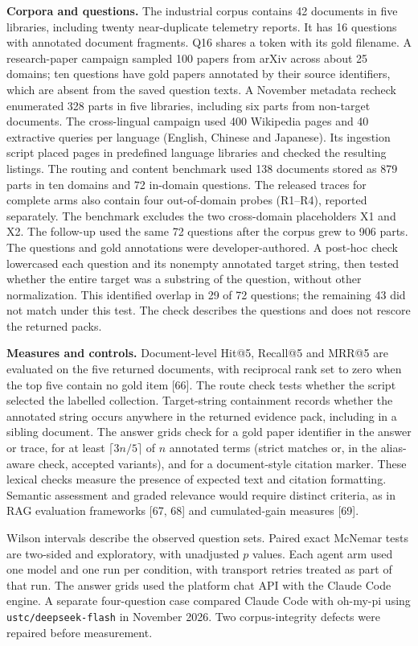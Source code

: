 \textbf{Corpora and questions.} The industrial corpus contains 42 documents
in five libraries, including twenty near-duplicate telemetry reports. It
has 16 questions with annotated document fragments. Q16 shares a token with
its gold filename. A research-paper campaign sampled 100 papers from arXiv
across about 25 domains; ten questions have gold papers annotated by their
source identifiers, which are absent from the saved question texts.
A November
metadata recheck enumerated 328 parts in five libraries, including six parts
from non-target documents. The
cross-lingual campaign used 400 Wikipedia pages and 40 extractive queries per
language (English, Chinese and Japanese). Its ingestion script placed pages
in predefined language libraries and checked the resulting listings.
The routing and content benchmark used 138 documents stored as 879 parts in
ten domains and 72 in-domain questions. The released traces for complete
arms also contain four out-of-domain probes (R1--R4), reported separately.
The benchmark excludes the two cross-domain placeholders X1 and X2. The
follow-up used the same 72 questions after the corpus grew to 906 parts.
The questions and gold annotations were developer-authored. A post-hoc
check lowercased each question and its nonempty annotated target string,
then tested whether the entire target was a substring of the question,
without other normalization. This identified overlap in 29 of 72 questions;
the remaining 43 did not match under this test. The check describes the
questions and does not rescore the returned packs.

\textbf{Measures and controls.} Document-level Hit@5, Recall@5 and
MRR@5 are evaluated on the five returned documents, with reciprocal rank set
to zero when the top five contain no gold item [66].
The route check tests whether the script selected the labelled collection.
Target-string containment records whether the annotated string occurs
anywhere in the returned evidence pack, including in a sibling document.
The answer grids check for a gold paper identifier in the answer or trace,
for at least $\lceil 3n/5\rceil$ of $n$ annotated terms (strict matches or,
in the alias-aware check, accepted variants), and for a document-style
citation marker. These lexical checks measure the presence of expected
text and citation formatting. Semantic assessment and graded relevance
would require distinct criteria, as in RAG evaluation frameworks
[67, 68] and cumulated-gain measures
[69].

Wilson intervals describe the observed question sets. Paired exact
McNemar tests are two-sided and exploratory, with unadjusted $p$ values.
Each agent arm used one model and one run per condition, with transport
retries treated as part of that run. The answer grids used the platform chat
API with the Claude Code engine. A separate four-question case compared
Claude Code with oh-my-pi using \texttt{ustc/deepseek-flash} in November
2026. Two corpus-integrity defects were repaired before measurement.

